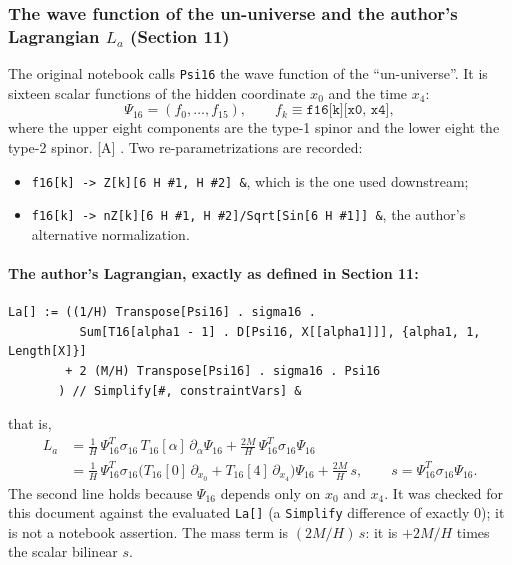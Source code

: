 \subsubsection{The wave function of the un-universe and the author's Lagrangian \texorpdfstring{$L_a$}{La} (Section 11)}
\label{fnd:La}\label{sec:3.1.7}

The original notebook calls \texttt{Psi16} the wave function of the ``un-universe''. It is
sixteen scalar functions of the hidden coordinate $x_0$ and the time $x_4$:
\begin{equation}
  \Psi_{16} = (f_0,\dots,f_{15}),\qquad f_k \equiv \texttt{f16[k][x0, x4]},
\end{equation}
where the upper eight components are the type-1 spinor and the lower eight the type-2 spinor.
[A] . Two re-parametrizations
are recorded:
\begin{itemize}
  \item \texttt{f16[k] -> Z[k][6 H \#1, H \#2] \&}, which is the one used downstream;
  \item \texttt{f16[k] -> nZ[k][6 H \#1, H \#2]/Sqrt[Sin[6 H \#1]] \&}, the author's alternative
        normalization.
\end{itemize}

\paragraph{The author's Lagrangian, exactly as defined in Section 11:}
\begin{footnotesize}
\begin{verbatim}
La[] := ((1/H) Transpose[Psi16] . sigma16 .
          Sum[T16[alpha1 - 1] . D[Psi16, X[[alpha1]]], {alpha1, 1, Length[X]}]
        + 2 (M/H) Transpose[Psi16] . sigma16 . Psi16
       ) // Simplify[#, constraintVars] &
\end{verbatim}
\end{footnotesize}
that is,
\begin{align}
  L_a &= \frac1H\,\Psi_{16}^{T}\sigma_{16}\,T_{16}[\alpha]\,\partial_\alpha\Psi_{16}
        + \frac{2M}{H}\,\Psi_{16}^{T}\sigma_{16}\Psi_{16} \\
      &= \frac1H\,\Psi_{16}^{T}\sigma_{16}\bigl(T_{16}[0]\,\partial_{x_0}+T_{16}[4]\,\partial_{x_4}\bigr)\Psi_{16}
        + \frac{2M}{H}\,s,\qquad s=\Psi_{16}^{T}\sigma_{16}\Psi_{16}.
\end{align}
The second line holds because $\Psi_{16}$ depends only on $x_0$ and $x_4$. It was checked for
this document against the evaluated \texttt{La[]} (a \texttt{Simplify} difference of exactly 0);
it is not a notebook assertion. The mass term is $(2M/H)\,s$: it is $+2M/H$ times the scalar
bilinear $s$.

